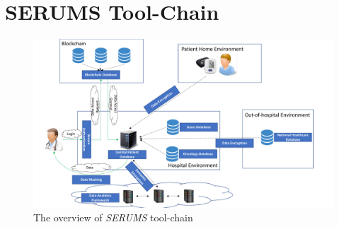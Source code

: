 
\section{SERUMS Tool-Chain} %

\begin{figure}[ht!]
    \centering
    \includegraphics[width=140mm]{images/SerumsOverview.pdf}
    \caption{The overview of \emph{SERUMS} tool-chain}
    \label{fig:serumsTools}
\end{figure}

